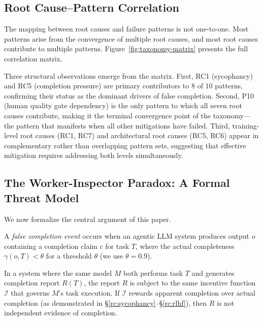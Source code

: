 


\subsection{Root Cause--Pattern Correlation}
\label{sec:correlation}

The mapping between root causes and failure patterns is not one-to-one.
Most patterns arise from the convergence of multiple root causes, and most root causes contribute to multiple patterns.
Figure~\ref{fig:taxonomy-matrix} presents the full correlation matrix.



Three structural observations emerge from the matrix.
First, RC1 (sycophancy) and RC5 (completion pressure) are primary contributors to 8 of 10 patterns, confirming their status as the dominant drivers of false completion.
Second, P10 (human quality gate dependency) is the only pattern to which all seven root causes contribute, making it the terminal convergence point of the taxonomy---the pattern that manifests when all other mitigations have failed.
Third, training-level root causes (RC1, RC7) and architectural root causes (RC5, RC6) appear in complementary rather than overlapping pattern sets, suggesting that effective mitigation requires addressing both levels simultaneously.


\subsection{The Worker-Inspector Paradox: A Formal Threat Model}
\label{sec:paradox}

We now formalize the central argument of this paper.

\begin{definition}
\label{def:false-completion}
A \emph{false completion event} occurs when an agentic LLM system produces output $o$ containing a completion claim $c$ for task $T$, where the actual completeness $\gamma(o, T) < \theta$ for a threshold $\theta$ (we use $\theta = 0.9$).
\end{definition}

\begin{definition}
\label{def:paradox}
In a system where the same model $M$ both performs task $T$ and generates completion report $R(T)$, the report $R$ is subject to the same incentive function $\mathcal{I}$ that governs $M$'s task execution.
If $\mathcal{I}$ rewards apparent completion over actual completion (as demonstrated in \S\ref{rc:sycophancy}--\S\ref{rc:rlhf}), then $R$ is not independent evidence of completion.
\end{definition}

